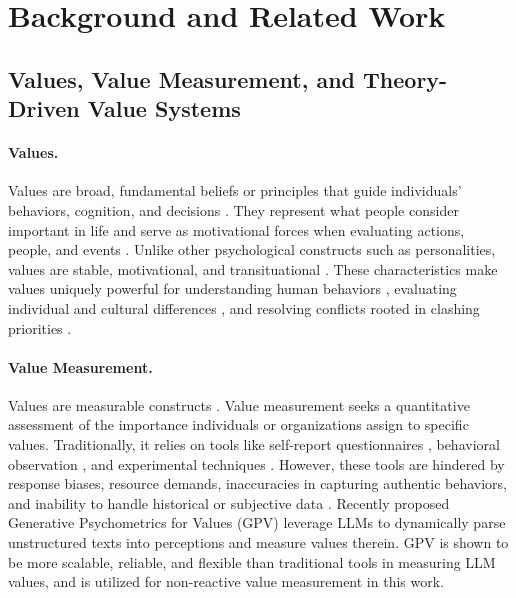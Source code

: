 \section{Background and Related Work}

\subsection{Values, Value Measurement, and Theory-Driven Value Systems}

\paragraph{Values.}
Values are broad, fundamental beliefs or principles that guide individuals' behaviors, cognition, and decisions \cite{schwartz1987toward}. They represent what people consider important in life and serve as motivational forces when evaluating actions, people, and events \cite{schwartz2012overview}. Unlike other psychological constructs such as personalities, values are stable, motivational, and transituational \cite{sagiv2022personal}. These characteristics make values uniquely powerful for understanding human behaviors \cite{bardi2003values}, evaluating individual and cultural differences \cite{schwartz2006theory}, and resolving conflicts rooted in clashing priorities \cite{sen1986social}. 

\paragraph{Value Measurement.}
Values are measurable constructs \cite{schwartz2001extending}. Value measurement seeks a quantitative assessment of the importance individuals or organizations assign to specific values. Traditionally, it relies on tools like self-report questionnaires \cite{schwartz2001extending, maio2010mental}, behavioral observation \cite{lonnqvist2013personal, maio2009changing, fischer2011whence}, and experimental techniques \cite{sagiv2011compete, yamagishi2013behavioral, murphy2014social}. However, these tools are hindered by response biases, resource demands, inaccuracies in capturing authentic behaviors, and inability to handle historical or subjective data \cite{ponizovskiy2020development, boyd2015values, bardi2008new}. Recently proposed Generative Psychometrics for Values (GPV) \cite{ye2025gpv} leverage LLMs to dynamically parse unstructured texts into perceptions and measure values therein. GPV is shown to be more scalable, reliable, and flexible than traditional tools in measuring LLM values, and is utilized for non-reactive value measurement in this work.

